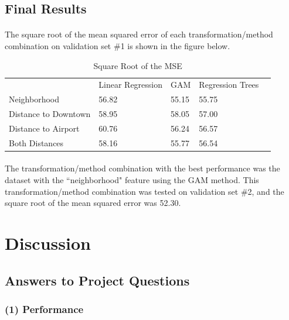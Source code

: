 \documentclass[11pt]{article}
\begin{document}
	\subsection{Final Results}
    	\paragraph{}
        	The square root of the mean squared error of each transformation/method combination on validation set \#1 is shown in the figure below.
        	\begin{table}[H]
              \centering
              \caption{Square Root of the MSE}
              \label{my-label}
              \begin{tabular}{l|llll}
                                     & Linear Regression & GAM & Regression Trees &  \\ \cline{1-4}
                Neighborhood         & 56.82             &  55.15   &    55.75     &  \\
                Distance to Downtown & 58.95             &  58.05   &    57.00   &  \\
                Distance to Airport  & 60.76             &  56.24   &    56.57   &  \\
                Both Distances       & 58.16             &  55.77   &    56.54     & 
              \end{tabular}
            \end{table}
            
        \paragraph{}
        	The transformation/method combination with the best performance was the dataset with the ``neighborhood" feature using the GAM method. This transformation/method combination was tested on validation set \#2, and the square root of the mean squared error was 52.30.
    
    \section{Discussion}
    \subsection{Answers to Project Questions}
    	\subsubsection*{(1) Performance}
\end{document}
